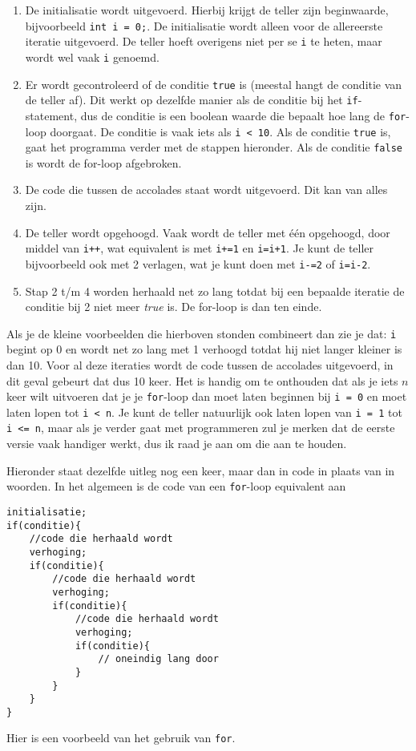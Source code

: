 \documentclass[12pt,a4paper]{article}
\newcommand{\icode}{\lstinline}
\begin{document}
\begin{enumerate}
	\item De initialisatie wordt uitgevoerd. Hierbij krijgt de teller zijn beginwaarde, bijvoorbeeld \icode{int i = 0;}. De initialisatie wordt alleen voor de allereerste iteratie uitgevoerd. De teller hoeft overigens niet per se \icode{i} te heten, maar wordt wel vaak \icode{i} genoemd. 
	\item Er wordt gecontroleerd of de conditie \icode{true} is (meestal hangt de conditie van de teller af). Dit werkt op dezelfde manier als de conditie bij het \icode{if}-statement, dus de conditie is een boolean waarde die bepaalt hoe lang de \icode{for}-loop doorgaat. De conditie is vaak iets als \icode{i < 10}. Als de conditie \icode{true} is, gaat het programma verder met de stappen hieronder. Als de conditie \icode{false} is wordt de for-loop afgebroken. 
	\item De code die tussen de accolades staat wordt uitgevoerd. Dit kan van alles zijn. 
	\item De teller wordt opgehoogd. Vaak wordt de teller met \'e\'en opgehoogd, door middel van \icode{i++}, wat equivalent is met \icode{i+=1} en \icode{i=i+1}. Je kunt de teller bijvoorbeeld ook met 2 verlagen, wat je kunt doen met \icode{i-=2} of \icode{i=i-2}.
	\item Stap 2 t/m 4 worden herhaald net zo lang totdat bij een bepaalde iteratie de conditie bij 2 niet meer \emph{true} is. De for-loop is dan ten einde. 
\end{enumerate}

Als je de kleine voorbeelden die hierboven stonden combineert dan zie je dat: \icode{i} begint op 0 en wordt net zo lang met 1 verhoogd totdat hij niet langer kleiner is dan 10. Voor al deze iteraties wordt de code tussen de accolades uitgevoerd, in dit geval gebeurt dat dus 10 keer. Het is handig om te onthouden dat als je iets $n$ keer wilt uitvoeren dat je je \icode{for}-loop dan moet laten beginnen bij \icode{i = 0} en moet laten lopen tot \icode{i < n}. Je kunt de teller natuurlijk ook laten lopen van \icode{i = 1} tot \icode{i <= n}, maar als je verder gaat met programmeren zul je merken dat de eerste versie vaak handiger werkt, dus ik raad je aan om die aan te houden.

Hieronder staat dezelfde uitleg nog een keer, maar dan in code in plaats van in woorden. In het algemeen is de code van een \icode{for}-loop equivalent aan
\begin{lstlisting}
initialisatie;
if(conditie){
	//code die herhaald wordt
	verhoging;
	if(conditie){
		//code die herhaald wordt
		verhoging;
		if(conditie){
			//code die herhaald wordt
			verhoging;
			if(conditie){
				// oneindig lang door
			}
		}
	}
}
\end{lstlisting}
Hier is een voorbeeld van het gebruik van \icode{for}.
\end{document}
